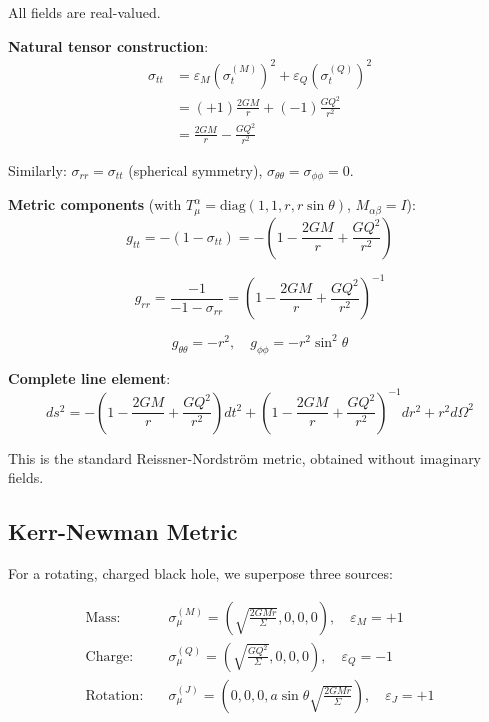 \documentclass[11pt,a4paper]{article}
\theoremstyle{definition}
\theoremstyle{remark}
\begin{document}
	All fields are real-valued.
	
	\textbf{Natural tensor construction}:
	\begin{align}
		\sigma_{tt} &= \varepsilon_M(\sigma_t^{(M)})^2 + \varepsilon_Q(\sigma_t^{(Q)})^2 \nonumber \\
		&= (+1)\frac{2GM}{r} + (-1)\frac{GQ^2}{r^2} \nonumber \\
		&= \frac{2GM}{r} - \frac{GQ^2}{r^2}
		\label{eq:rn_sigma_tt}
	\end{align}
	
	Similarly: $\sigma_{rr} = \sigma_{tt}$ (spherical symmetry), $\sigma_{\theta\theta} = \sigma_{\phi\phi} = 0$.
	
	\textbf{Metric components} (with $T^\alpha_\mu = \text{diag}(1,1,r,r\sin\theta)$, $M_{\alpha\beta} = I$):
	\begin{equation}
		g_{tt} = -(1 - \sigma_{tt}) = -\left(1 - \frac{2GM}{r} + \frac{GQ^2}{r^2}\right)
		\label{eq:rn_gtt}
	\end{equation}
	
	\begin{equation}
		g_{rr} = \frac{-1}{-1 - \sigma_{rr}} = \left(1 - \frac{2GM}{r} + \frac{GQ^2}{r^2}\right)^{-1}
		\label{eq:rn_grr}
	\end{equation}
	
	\begin{equation}
		g_{\theta\theta} = -r^2, \quad g_{\phi\phi} = -r^2\sin^2\theta
	\end{equation}
	
	\textbf{Complete line element}:
	\begin{equation}
		\boxed{ds^2 = -\left(1-\frac{2GM}{r}+\frac{GQ^2}{r^2}\right)dt^2 + \left(1-\frac{2GM}{r}+\frac{GQ^2}{r^2}\right)^{-1}dr^2 + r^2 d\Omega^2}
		\label{eq:rn_metric}
	\end{equation}
	
	This is the standard Reissner-Nordström metric, obtained without imaginary fields.
	
	\subsection{Kerr-Newman Metric}
	
	For a rotating, charged black hole, we superpose three sources:
	
	\begin{align}
		\text{Mass:} \quad & \sigma_\mu^{(M)} = \left(\sqrt{\frac{2GMr}{\Sigma}}, 0, 0, 0\right), \quad \varepsilon_M = +1 \\
		\text{Charge:} \quad & \sigma_\mu^{(Q)} = \left(\sqrt{\frac{GQ^2}{\Sigma}}, 0, 0, 0\right), \quad \varepsilon_Q = -1 \\
		\text{Rotation:} \quad & \sigma_\mu^{(J)} = \left(0, 0, 0, a\sin\theta\sqrt{\frac{2GMr}{\Sigma}}\right), \quad \varepsilon_J = +1
	\end{align}
	
\end{document}
